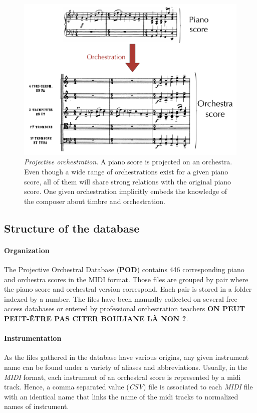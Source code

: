 \documentclass[twoside,twocolumn]{article}
\begin{document}
\begin{figure}
\centering
\includegraphics[scale=0.14]{Data_representation/orch}
\caption{\textit{Projective orchestration}. A piano score is projected on an orchestra. Even though a wide range of orchestrations exist for a given piano score, all of them will share strong relations with the original piano score. One given orchestration implicitly embeds the knowledge of the composer about timbre and orchestration.}
\label{fig:orch}
\end{figure}

\subsection{Structure of the database}
\paragraph{Organization}
The Projective Orchestral Database (\textbf{POD}) contains 446 corresponding piano and orchestra scores in the MIDI format.
Those files are grouped by pair where the piano score and orchestral version correspond.
Each pair is stored in a folder indexed by a number.
The files have been manually collected on several free-access databases \cite{imslp} or entered by professional orchestration teachers \textbf{ON PEUT PEUT-ÊTRE PAS CITER BOULIANE LÀ NON ?}.

\paragraph{Instrumentation}
As the files gathered in the database have various origins, any given instrument name can be found under a variety of aliases and abbreviations. 
Usually, in the \textit{MIDI} format, each instrument of an orchestral score is represented by a midi track.
Hence, a comma separated value (\textit{CSV}) file is associated to each \textit{MIDI} file with an identical name that links the name of the midi tracks to normalized names of instrument.
\end{document}
